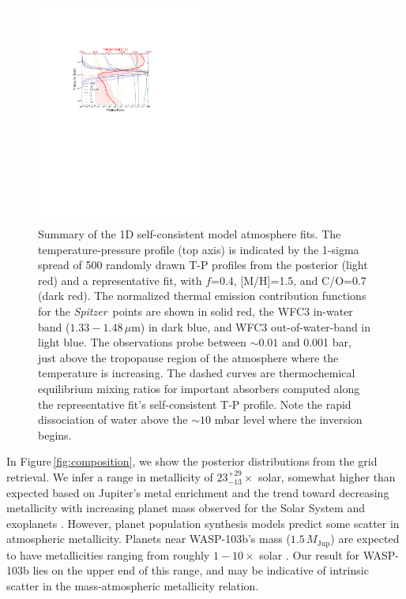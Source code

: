 \documentclass[twocolumn]{aastex61}
\newcommand{\project}[1]{\textsl{#1}}
\newcommand{\Spitzer}{\project{Spitzer}}
\begin{document}
\begin{figure}
\includegraphics[width = 0.5\textwidth]{Figures/atmosphere_summary.pdf}
\caption{Summary of the 1D self-consistent model atmosphere fits.  The temperature-pressure profile (top axis) is indicated by the 1-sigma spread of 500 randomly drawn T-P profiles from the posterior (light red) and a representative fit, with $f$=0.4, [M/H]=1.5, and C/O=0.7 (dark red).  The normalized thermal emission contribution functions for the \Spitzer\ points are shown in solid red, the WFC3 in-water band ($1.33-1.48\,\mu$m) in dark blue, and WFC3 out-of-water-band in light blue.  The observations probe between $\sim0.01$ and 0.001 bar, just above the tropopause region of the atmosphere where the temperature is increasing.  The dashed curves are thermochemical equilibrium mixing ratios for important absorbers computed along the representative fit's self-consistent T-P profile.  Note the rapid dissociation of water above the $\sim10$ mbar level where the inversion begins.}
\label{fig:summary}
\end{figure}

In Figure\,\ref{fig:composition}, we show the posterior distributions from the grid retrieval.  We infer a range in metallicity of $23^{+29}_{-13}\times$ solar, somewhat higher than expected based on Jupiter's metal enrichment \citep[$3-5\times$ solar;][]{wong04} and the trend toward decreasing metallicity with increasing planet mass observed for the Solar System and exoplanets \cite[e.g.][]{kreidberg14b}.  However, planet population synthesis models predict some scatter in atmospheric metallicity. Planets near WASP-103b's mass ($1.5\,M_\mathrm{Jup}$) are expected to have metallicities ranging from roughly $1-10\times$ solar \citep{mordasini16}. Our result for WASP-103b lies on the upper end of this range, and may be indicative of intrinsic scatter in the mass-atmospheric metallicity relation. 
\end{document}
